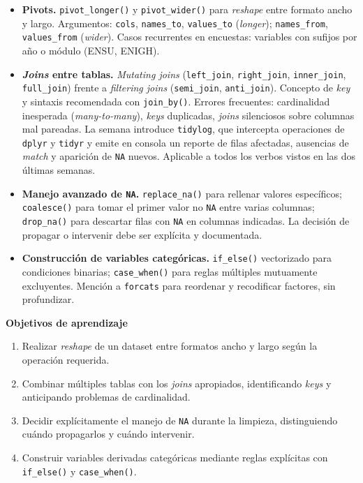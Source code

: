 \documentclass[11pt,letterpaper]{article}
\begin{document}
\begin{itemize}[leftmargin=*, itemsep=2pt]
    \item \textbf{Pivots.} \texttt{pivot\_longer()} y \texttt{pivot\_wider()} para \textit{reshape} entre formato ancho y largo. Argumentos: \texttt{cols}, \texttt{names\_to}, \texttt{values\_to} (\textit{longer}); \texttt{names\_from}, \texttt{values\_from} (\textit{wider}). Casos recurrentes en encuestas: variables con sufijos por año o módulo (ENSU, ENIGH).
    \item \textbf{\textit{Joins} entre tablas.} \textit{Mutating joins} (\texttt{left\_join}, \texttt{right\_join}, \texttt{inner\_join}, \texttt{full\_join}) frente a \textit{filtering joins} (\texttt{semi\_join}, \texttt{anti\_join}). Concepto de \textit{key} y sintaxis recomendada con \texttt{join\_by()}. Errores frecuentes: cardinalidad inesperada (\textit{many-to-many}), \textit{keys} duplicadas, \textit{joins} silenciosos sobre columnas mal pareadas. La semana introduce \texttt{tidylog}, que intercepta operaciones de \texttt{dplyr} y \texttt{tidyr} y emite en consola un reporte de filas afectadas, ausencias de \textit{match} y aparición de \texttt{NA} nuevos. Aplicable a todos los verbos vistos en las dos últimas semanas.
    \item \textbf{Manejo avanzado de \texttt{NA}.} \texttt{replace\_na()} para rellenar valores específicos; \texttt{coalesce()} para tomar el primer valor no \texttt{NA} entre varias columnas; \texttt{drop\_na()} para descartar filas con \texttt{NA} en columnas indicadas. La decisión de propagar o intervenir debe ser explícita y documentada.
    \item \textbf{Construcción de variables categóricas.} \texttt{if\_else()} vectorizado para condiciones binarias; \texttt{case\_when()} para reglas múltiples mutuamente excluyentes. Mención a \texttt{forcats} para reordenar y recodificar factores, sin profundizar.
\end{itemize}

\medskip
\noindent\textbf{Objetivos de aprendizaje}
\begin{enumerate}[leftmargin=*, itemsep=1pt]
    \item Realizar \textit{reshape} de un dataset entre formatos ancho y largo según la operación requerida.
    \item Combinar múltiples tablas con los \textit{joins} apropiados, identificando \textit{keys} y anticipando problemas de cardinalidad.
    \item Decidir explícitamente el manejo de \texttt{NA} durante la limpieza, distinguiendo cuándo propagarlos y cuándo intervenir.
    \item Construir variables derivadas categóricas mediante reglas explícitas con \texttt{if\_else()} y \texttt{case\_when()}.
\end{enumerate}
\end{document}
